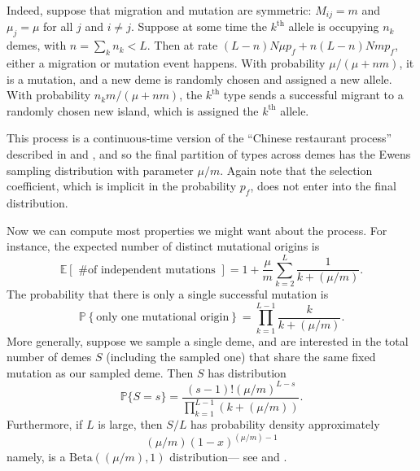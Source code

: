 \documentclass{article}
\renewcommand{\P}{\mathbb{P}}
\newcommand{\E}{\mathbb{E}}
\begin{document}
Indeed, suppose that migration and mutation are symmetric: $M_{ij}=m$ and $\mu_j = \mu$ for all $j$ and $i\neq j$.
Suppose at some time the $k^\mathrm{th}$ allele is occupying $n_k$ demes, 
with $n = \sum_k n_k < L$.
Then at rate $(L-n) N \mu p_f + n (L-n) N m p_f$,
either a migration or mutation event happens.
With probability $\mu/(\mu + n m)$, it is a mutation,
and a new deme is randomly chosen and assigned a new allele.
With probability $n_k m / (\mu + n m)$,
the $k^\mathrm{th}$ type sends a successful migrant to a randomly chosen new island,
which is assigned the $k^\mathrm{th}$ allele.

This process is a continuous-time version of the ``Chinese restaurant process''
described in \citet{aldous1985exchangeability} and \citet{pitman1995partitions},
and so the final partition of types across demes has the Ewens sampling distribution with parameter $\mu/m$.
Again note that the selection coefficient, which is implicit in the probability $p_f$,
does not enter into the final distribution.

Now we can compute most properties we might want about the process.
For instance, the expected number of distinct mutational origins is
\begin{equation}
    \E\left[ \mbox{ \# of independent mutations } \right] = 
            1 + \frac{\mu}{m} \sum_{k=2}^L \frac{1}{k+(\mu/m)}. \label{discrete_expected}
\end{equation}
The probability that there is only a single successful mutation is
\begin{equation}
\P \left\{ \mbox{only one mutational origin} \right\} = 
            \prod_{k=1}^{L-1} \frac{ k }{ k+(\mu/m)} .
\end{equation}
More generally, suppose we sample a single deme, and are interested in the total number of demes $S$
(including the sampled one) that share the same fixed mutation as our sampled deme.
Then $S$ has distribution
\begin{equation} \label{eqn:Sdistrn}
\P\{ S=s \} = \frac{ (s-1)! (\mu/m)^{L-s} }{ \prod_{k=1}^{L-1} (k+(\mu/m)) } .
\end{equation}
Furthermore, if $L$ is large, then $S/L$ has probability density approximately
\begin{equation} \label{eqn:betadistrn}
   (\mu/m) (1-x)^{(\mu/m)-1}
\end{equation}
namely, is a $\mathrm{Beta}((\mu/m), 1)$ distribution--- see \cite{donnelly1989continuity} and \cite{perman1992sizebiased}.
\end{document}
